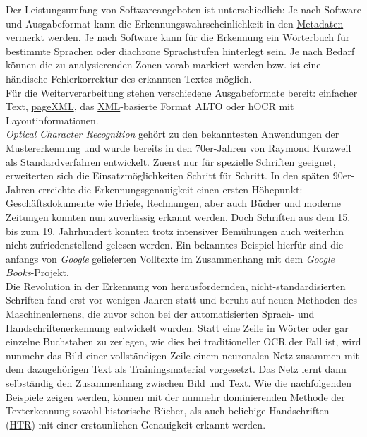 \documentclass{article}
\begin{document}
        Der Leistungsumfang von Softwareangeboten ist unterschiedlich: Je nach Software
                  und Ausgabeformat kann die Erkennungswahrscheinlichkeit in den \href{http://gams.uni-graz.at/o:konde.25}{Metadaten} vermerkt werden. Je nach
                  Software kann für die Erkennung ein Wörterbuch für bestimmte Sprachen oder
                  diachrone Sprachstufen hinterlegt sein. Je nach Bedarf können die zu
                  analysierenden Zonen vorab markiert werden bzw. ist eine händische Fehlerkorrektur
                  des erkannten Textes möglich.\\
            
        Für die Weiterverarbeitung stehen verschiedene Ausgabeformate bereit: einfacher
                  Text, \href{http://gams.uni-graz.at/o:konde.154}{pageXML}, das \href{http://gams.uni-graz.at/o:konde.215}{XML}-basierte Format ALTO oder hOCR
                  mit Layoutinformationen.\\
            
        \emph{Optical Character Recognition} gehört zu den bekanntesten
                  Anwendungen der Mustererkennung und wurde bereits in den 70er-Jahren von Raymond
                  Kurzweil als Standardverfahren entwickelt. Zuerst nur für spezielle Schriften
                  geeignet, erweiterten sich die Einsatzmöglichkeiten Schritt für Schritt. In den
                  späten 90er-Jahren erreichte die Erkennungsgenauigkeit einen ersten Höhepunkt:
                  Geschäftsdokumente wie Briefe, Rechnungen, aber auch Bücher und moderne Zeitungen
                  konnten nun zuverlässig erkannt werden. Doch Schriften aus dem 15. bis zum 19.
                  Jahrhundert konnten trotz intensiver Bemühungen auch weiterhin nicht
                  zufriedenstellend gelesen werden. Ein bekanntes Beispiel hierfür sind die anfangs
                  von \emph{Google} gelieferten Volltexte im Zusammenhang mit dem
                     \emph{Google Books}-Projekt.\\
            
        Die Revolution in der Erkennung von herausfordernden, nicht-standardisierten
                  Schriften fand erst vor wenigen Jahren statt und beruht auf neuen Methoden des
                  Maschinenlernens, die zuvor schon bei der automatisierten Sprach- und
                  Handschriftenerkennung entwickelt wurden. Statt eine Zeile in Wörter oder gar
                  einzelne Buchstaben zu zerlegen, wie dies bei traditioneller OCR der Fall ist,
                  wird nunmehr das Bild einer vollständigen Zeile einem neuronalen Netz zusammen mit
                  dem dazugehörigen Text als Trainingsmaterial vorgesetzt. Das Netz lernt dann
                  selbständig den Zusammenhang zwischen Bild und Text. Wie die nachfolgenden
                  Beispiele zeigen werden, können mit der nunmehr dominierenden Methode der
                  Texterkennung sowohl historische Bücher, als auch beliebige Handschriften (\href{http://gams.uni-graz.at/o:konde.224}{HTR}) mit einer erstaunlichen
                  Genauigkeit erkannt werden. \\
            
\end{document}
